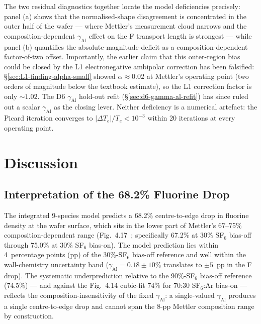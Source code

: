 \documentclass[11pt,a4paper]{report}
\begin{document}
The two residual diagnostics together locate the model deficiencies precisely: panel (a) shows that the normalised-shape disagreement is concentrated in the outer half of the wafer --- where Mettler's measurement cloud narrows and the composition-dependent $\gamma_\mathrm{Al}$ effect on the F transport length is strongest --- while panel (b) quantifies the absolute-magnitude deficit as a composition-dependent factor-of-two offset.  Importantly, the earlier claim that this outer-region bias could be closed by the L1 electronegative ambipolar correction has been falsified: \S\ref{sec:L1-finding-alpha-small} showed $\alpha \approx 0.02$ at Mettler's operating point (two orders of magnitude below the textbook estimate), so the L1 correction factor is only $\sim 1.02$.  The D6 $\gamma_\mathrm{Al}$ hold-out refit (\S\ref{sec:d6-gamma-al-refit}) has since ruled out a scalar $\gamma_\mathrm{Al}$ as the closing lever.  Neither deficiency is a numerical artefact: the Picard iteration converges to $|\Delta T_e|/T_e < 10^{-3}$ within 20 iterations at every operating point.


\section{Discussion}
\label{sec:discussion}

\subsection{Interpretation of the 68.2\% Fluorine Drop}

The integrated 9-species model predicts a 68.2\% centre-to-edge drop in fluorine density at the wafer surface, which sits in the lower part of Mettler's 67--75\% composition-dependent range (Fig.~4.17~\cite{Mettler2025}; specifically 67.2\% at 30\% SF$_6$ bias-off through 75.0\% at 30\% SF$_6$ bias-on).  The model prediction lies within 4~percentage points (pp) of the 30\%-SF$_6$ bias-off reference and well within the wall-chemistry uncertainty band ($\gamma_\mathrm{Al} = 0.18 \pm 10\%$ translates to $\pm 5$~pp in the F drop).  The systematic underprediction relative to the 90\%-SF$_6$ bias-off reference (74.5\%) --- and against the Fig.~4.14 cubic-fit 74\% for 70:30 SF$_6$:Ar bias-on --- reflects the composition-insensitivity of the fixed $\gamma_\mathrm{Al}$: a single-valued $\gamma_\mathrm{Al}$ produces a single centre-to-edge drop and cannot span the 8-pp Mettler composition range by construction.
\end{document}
